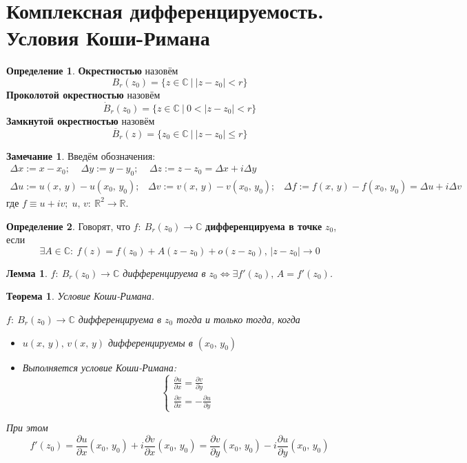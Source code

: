 \documentclass[a4paper,12pt]{article}
\renewcommand{\leq}{\ensuremath{\leqslant}}
\theoremstyle{plain}
\newtheorem{theorem}{Теорема}[section]
\newtheorem{lemma}{Лемма}[section]
\theoremstyle{definition}
\newtheorem{definition}{Определение}[section]
\newtheorem*{note}{Замечание}
\theoremstyle{remark}
\begin{document}
\tableofcontents
\newpage

\section{Комплексная дифференцируемость. Условия Коши-Римана}
\begin{definition}
	\textbf{Окрестностью} назовём
	\[
		B_r(z_0) = \{z \in \mathbb{C} \:\vert\: \vert z - z_0\vert < r\}
	\]
	\textbf{Проколотой окрестностью} назовём
	\[
		\dot{B}_r(z_0) = \{z \in \mathbb{C} \:\vert\: 0 < \vert z - z_0\vert < r\}
	\]
	\textbf{Замкнутой окрестностью} назовём
	\[
		\overline{B}_r(z) = \{z_0 \in \mathbb{C} \:\vert\: \vert z - z_0\vert \leq r\}
	\]
\end{definition}

\begin{note}
	Введём обозначения:
	\begin{align*}
		\Delta x := x - x_0 ;\;\;\;\; \Delta y := y - y_0 ;\;\;\;\; \Delta z := z - z_0 = \Delta x + i\Delta y \\
		\Delta u := u(x,\,y) - u(x_0,\,y_0);\;\;\; \Delta v := v(x,\,y) - v(x_0,\, y_0) ;\;\;\; \Delta f := f(x,\, y) - f(x_0,\, y_0) = \Delta u + i\Delta v
	\end{align*}
	где $f \equiv u + iv;\; u,\,v :\: \mathbb{R}^2 \to \mathbb{R}$.
\end{note}

\begin{definition}
	Говорят, что $f :\: B_r(z_0) \to \mathbb{C}$ \textbf{дифференцируема в точке} $z_0$, если
	\[
		\exists A \in \mathbb{C} :\: f(z) = f(z_0) + A(z - z_0) + o(z - z_0),\, \vert z - z_0\vert \to 0
	\]
\end{definition}

\begin{lemma}
	$f :\: B_r(z_0) \to \mathbb{C}$ дифференцируема в $z_0 \Leftrightarrow \exists f'(z_0),\, A = f'(z_0)$.
\end{lemma}

\begin{theorem}
	Условие Коши-Римана.

	$f :\: B_r(z_0) \to \mathbb{C}$ дифференцируема в $z_0$ тогда и только тогда, когда
	\begin{itemize}
		\item $u(x,\, y),\, v(x,\, y)$ дифференцируемы в $(x_0,\, y_0)$
		\item Выполняется условие Коши-Римана:
		      \[
			      \begin{cases}
				      \frac{\partial u}{\partial x} = \frac{\partial v}{\partial y} \\
				      \frac{\partial v}{\partial x} = -\frac{\partial u}{\partial y}
			      \end{cases}
		      \]
	\end{itemize}
	При этом
	\[
		f'(z_0) = \frac{\partial u}{\partial x}(x_0,\, y_0) + i\frac{\partial v}{\partial x}(x_0,\, y_0) = \frac{\partial v}{\partial y}(x_0,\, y_0) - i\frac{\partial u}{\partial y}(x_0,\, y_0)
	\]
\end{theorem}
\end{document}

